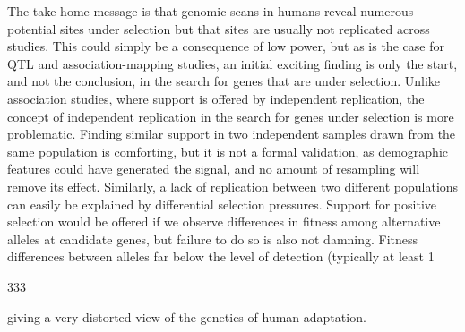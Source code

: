 \documentclass{article}
\begin{document}
The take-home message is that genomic scans in humans reveal numerous potential sites under selection but that sites are usually not replicated across studies. This could simply be a consequence of low power, but as is the case for QTL and association-mapping studies, an initial exciting finding is only the start, and not the conclusion, in the search for genes that are under selection. Unlike association studies, where support is offered by independent replication, the concept of independent replication in the search for genes under selection is more problematic. Finding similar support in two independent samples drawn from the same population is comforting, but it is not a formal validation, as demographic features could have generated the signal, and no amount of resampling will remove its effect. Similarly, a lack of replication between two different populations can easily be explained by differential selection pressures. Support for positive selection would be offered if we observe differences in fitness among alternative alleles at candidate genes, but failure to do so is also not damning. Fitness differences between alleles far below the level of detection (typically at least 1%

333

giving a very distorted view of the genetics of human adaptation.
\end{document}
